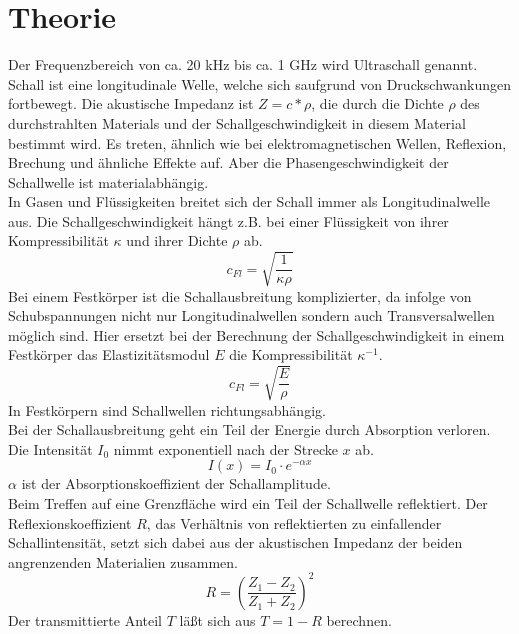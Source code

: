 \section{Theorie}
\label{sec:Theorie}
Der Frequenzbereich von ca. 20 kHz bis ca. 1 GHz wird Ultraschall genannt.
Schall ist eine longitudinale Welle, welche sich saufgrund von Druckschwankungen fortbewegt.
Die akustische Impedanz ist $Z = c * \rho$, die durch die Dichte $\rho$ des durchstrahlten Materials und der Schallgeschwindigkeit in diesem Material bestimmt wird.
Es treten, ähnlich wie bei elektromagnetischen Wellen, Reflexion, Brechung und ähnliche Effekte auf.
Aber die Phasengeschwindigkeit der Schallwelle ist materialabhängig. \\

In Gasen und Flüssigkeiten breitet sich der Schall immer als Longitudinalwelle aus.
Die Schallgeschwindigkeit hängt z.B. bei einer Flüssigkeit von ihrer Kompressibilität $\kappa$ und ihrer Dichte $\rho$ ab.
\begin{equation}
    c_{Fl} = \sqrt{\frac{1}{\kappa \rho}}
    \label{eqn:gl1}
\end{equation}
Bei einem Festkörper ist die Schallausbreitung komplizierter, da infolge von Schubspannungen nicht nur Longitudinalwellen sondern auch Transversalwellen möglich sind.
Hier ersetzt bei der Berechnung der Schallgeschwindigkeit in einem Festkörper das Elastizitätsmodul $E$ die Kompressibilität $\kappa^{-1}$.
\begin{equation}
    c_{Fl} = \sqrt{\frac{E}{\rho}}
    \label{eqn:gl2}
\end{equation}
In Festkörpern sind Schallwellen richtungsabhängig. \\

Bei der Schallausbreitung geht ein Teil der Energie durch Absorption verloren.
Die Intensität $I_0$ nimmt exponentiell nach der Strecke $x$ ab.
\begin{equation}
    I(x) = I_0 \cdot e^{-\alpha x}
    \label{eqn:gl3}
\end{equation}
$\alpha$ ist der Absorptionskoeffizient der Schallamplitude. \\

Beim Treffen auf eine Grenzfläche wird ein Teil der Schallwelle reflektiert.
Der Reflexionskoeffizient $R$, das Verhältnis von reflektierten zu einfallender Schallintensität, setzt sich dabei aus der akustischen Impedanz der beiden angrenzenden Materialien zusammen.
\begin{equation}
    R = \left(\frac{Z_1-Z_2}{Z_1+Z_2}\right)^2
\end{equation}
Der transmittierte Anteil $T$ läßt sich aus $T = 1 − R$ berechnen.\\

